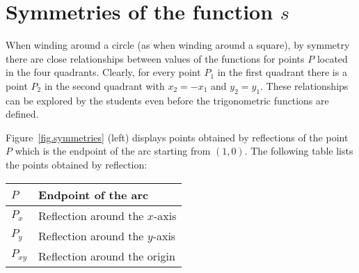 \section{Symmetries of the function \texorpdfstring{$s$}{s}}

When winding around a circle (as when winding around a square), by symmetry there are close relationships between values of the functions for points $P$ located in the four quadrants.
Clearly, for every point $P_1$ in the first quadrant there is a point $P_2$ in the second quadrant with $x_2=-x_1$ and $y_2=y_1$.
These relationships can be explored by the students even before the trigonometric functions are defined.

Figure~\ref{fig.symmetries} (left) displays points obtained by reflections of the point $P$ which is the endpoint of the arc starting from $(1,0)$. The following table lists the points obtained by reflection:
\begin{center}
\begin{tabular}{|l|l|}
\hline
$P$ & Endpoint of the arc\\\hline
$P_x$ & Reflection around the $x$-axis\\\hline
$P_y$ & Reflection around the $y$-axis\\\hline
$P_{xy}$ & Reflection around the origin\\\hline
\end{tabular}
\end{center}

\bigskip

